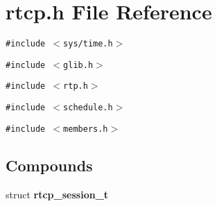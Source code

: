 \section{rtcp.h File Reference}
\label{rtcp_8h}
{\tt \#include $<$sys/time.h$>$}\par
{\tt \#include $<$glib.h$>$}\par
{\tt \#include $<$rtp.h$>$}\par
{\tt \#include $<$schedule.h$>$}\par
{\tt \#include $<$members.h$>$}\par
\subsection*{Compounds}
\begin{CompactItemize}
\item 
struct {\bf rtcp\_\-session\_\-t}
\end{CompactItemize}
